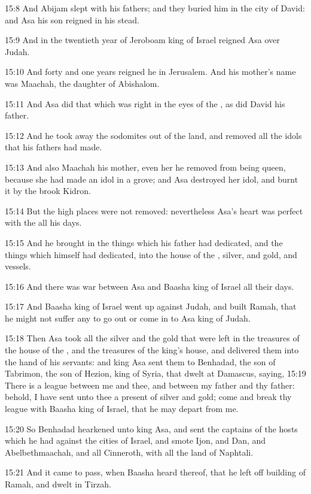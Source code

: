 15:8 And Abijam slept with his fathers; and they buried him in the
city of David: and Asa his son reigned in his stead.

15:9 And in the twentieth year of Jeroboam king of Israel reigned Asa
over Judah.

15:10 And forty and one years reigned he in Jerusalem. And his
mother's name was Maachah, the daughter of Abishalom.

15:11 And Asa did that which was right in the eyes of the \LORD, as did
David his father.

15:12 And he took away the sodomites out of the land, and removed all
the idols that his fathers had made.

15:13 And also Maachah his mother, even her he removed from being
queen, because she had made an idol in a grove; and Asa destroyed her
idol, and burnt it by the brook Kidron.

15:14 But the high places were not removed: nevertheless Asa's heart
was perfect with the \LORD all his days.

15:15 And he brought in the things which his father had dedicated, and
the things which himself had dedicated, into the house of the \LORD,
silver, and gold, and vessels.

15:16 And there was war between Asa and Baasha king of Israel all
their days.

15:17 And Baasha king of Israel went up against Judah, and built
Ramah, that he might not suffer any to go out or come in to Asa king
of Judah.

15:18 Then Asa took all the silver and the gold that were left in the
treasures of the house of the \LORD, and the treasures of the king's
house, and delivered them into the hand of his servants: and king Asa
sent them to Benhadad, the son of Tabrimon, the son of Hezion, king of
Syria, that dwelt at Damascus, saying, 15:19 There is a league between
me and thee, and between my father and thy father: behold, I have sent
unto thee a present of silver and gold; come and break thy league with
Baasha king of Israel, that he may depart from me.

15:20 So Benhadad hearkened unto king Asa, and sent the captains of
the hosts which he had against the cities of Israel, and smote Ijon,
and Dan, and Abelbethmaachah, and all Cinneroth, with all the land of
Naphtali.

15:21 And it came to pass, when Baasha heard thereof, that he left off
building of Ramah, and dwelt in Tirzah.

